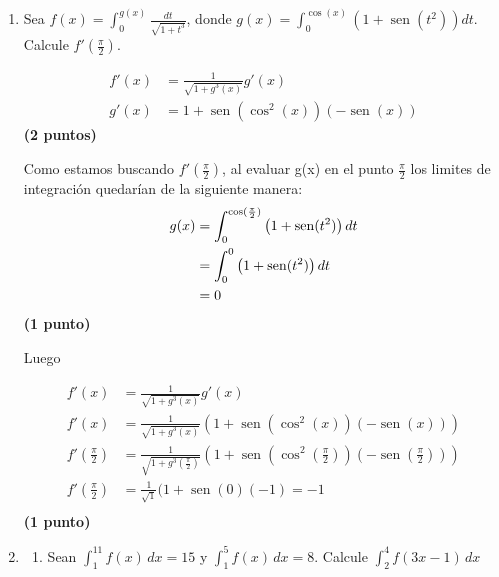 \documentclass[letterpaper,10pt]{article}
\newcommand{\dis}{\displaystyle}
\def\sin{\operatorname{sen}}
\begin{document}
\begin{enumerate}
\newpage







\item Sea $\dis f(x)= \int_{0}^{g(x)} \frac{dt}{\sqrt{1+t^3}}$, donde $\dis g(x)= \int_{0}^{\cos(x)} \left(1+ \sin (t^2)\right)dt$. Calcule $\dis f'\left(\frac{\pi}{2}\right)$.\\
\vspace{4mm}

\begin{align*}
 \dis  f'(x)&= \frac{1}{\sqrt{1+g^3(x)}}g'(x)\\
  \dis   g'(x)&= 1+\sin(\cos^2(x))(-\sin(x))
\end{align*}
\dotfill \textbf{(2 puntos)}

Como estamos buscando $\dis f'\left(\frac{\pi}{2}\right)$, al evaluar g(x) en el punto $\frac{\pi}{2}$ los limites de integración quedarían de la siguiente manera:\\

\begin{align*}
 \dis  g(x) &= \int_{0}^{\cos(\frac{\pi}{2})} \left(1+ \sin (t^2)\right)dt\\
 \dis   &= \int_{0}^{0} \left(1+ \sin (t^2)\right)dt\\
  \dis   &= 0\\
\end{align*}
\dotfill \textbf{(1 punto)}

Luego

\begin{align*}
 \dis  f'(x)&= \frac{1}{\sqrt{1+g^3(x)}}g'(x)\\
  \dis  f'(x)&= \frac{1}{\sqrt{1+g^3(x)}}(1+\sin(\cos^2(x))(-\sin(x)))\\
    \dis  f'(\frac{\pi}{2})&= \frac{1}{\sqrt{1+g^3(\frac{\pi}{2})}}(1+\sin(\cos^2(\frac{\pi}{2}))(-\sin(\frac{\pi}{2})))\\
    \dis  f'(\frac{\pi}{2})&= \frac{1}{\sqrt{1}}(1+\sin(0)(-1) = -1\\
\end{align*}
\dotfill \textbf{(1 punto)}

\newpage





\item 
\begin{enumerate}[label=\emph{\alph*)}]
\item Sean $\dis \int_1^{11} f(x)\, dx = 15$ y $\dis \int_1^{5} f(x)\, dx = 8$. Calcule $\dis \int_2^{4} f(3x-1)\, dx$\\


\end{enumerate}
\end{enumerate}
\end{document}
